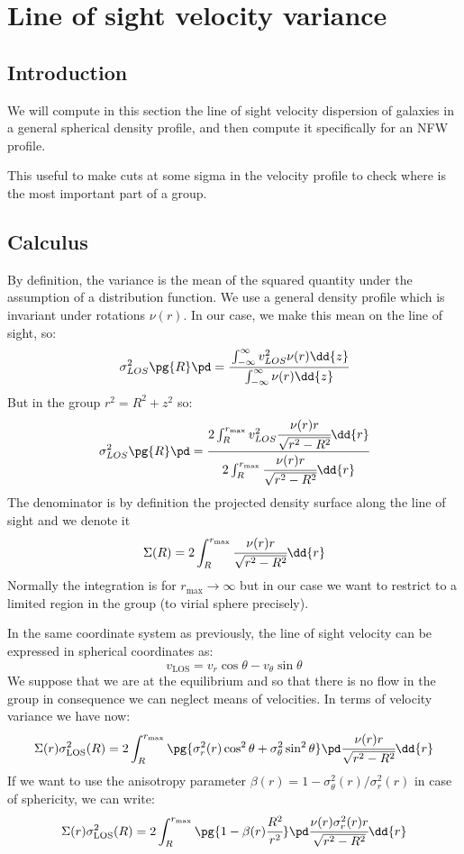 %
\chapter{Line of sight velocity variance}

\newcommand{\mybeta}{%
\beta(r)%
}
\newcommand{\mysigma}{%
\Sigma(r)%
}
\newcommand{\mysiglos}{%
\sigma_{\mathrm{LOS}}^2(R)%
}
\newcommand{\myprofil}{%
\nu(r)%
}

\section{Introduction}

We will compute in this section the line of sight velocity dispersion
of galaxies in a general spherical density profile, and then compute it
specifically for an NFW profile.

This useful to make cuts at some sigma in the velocity profile to check
where is the most important part of a group.

\section{Calculus}

By definition, the variance is the mean of the squared quantity under the
assumption of a distribution function.
We use a general density profile which is invariant under rotations $\nu{(r)}$.
In our case, we make this mean on the line of sight, so:
\[
\sigma_{LOS}^2\pg{R}\pd=\cfrac{\int_{-\infty}^{\infty}{v_{LOS}^2}\nu{(r)}\dd{z}}
{\int_{-\infty}^{\infty}\nu{(r)}\dd{z}}
\]
But in the group $r^2=R^2+z^2$ so:
\[
\sigma_{LOS}^2\pg{R}\pd=\cfrac{2\int_{R}^{r_{\mathrm{max}}}{v_{LOS}^2}\cfrac{\nu{(r)}{r}}{\sqrt{r^2-R^2}}\dd{r}}
{2\int_{R}^{r_{\mathrm{max}}}\cfrac{\nu{(r)}{r}}{\sqrt{r^2-R^2}}\dd{r}}
\]
The denominator is by definition the projected density surface along the line of sight
and we denote it
\[
\Sigma(R) = 2\int_{R}^{r_{\mathrm{max}}}\cfrac{\nu{(r)}{r}}{\sqrt{r^2-R^2}}\dd{r}
\]
Normally the integration is for $r_{\mathrm{max}}\rightarrow\infty$ but in our case
we want to restrict to a limited region in the group (to virial sphere precisely).

In the same coordinate system as previously, the line of sight velocity can be expressed
in spherical coordinates as:
\[
v_{\mathrm{LOS}} = v_r \cos\theta - v_\theta \sin\theta
\]
We suppose that we are at the equilibrium and so that there is
no flow in the group in consequence we can neglect means of velocities.
In terms of velocity variance we have now:
\[
\mysigma\mysiglos = 2\int_R^{r_{\mathrm{max}}}
\pg{\sigma_r^2(r)\cos^2\theta+\sigma_\theta^2\sin^2\theta}\pd
\cfrac{\nu{(r)}{r}}{\sqrt{r^2-R^2}}\dd{r}
\]
If we want to use the anisotropy parameter $\mybeta=1-\sigma_\theta^2(r)/\sigma_r^2(r)$
in case of sphericity, we can write:
\[
\mysigma\mysiglos = 2\int_R^{r_{\mathrm{max}}}
\pg{1-\mybeta\cfrac{R^2}{r^2}}\pd
\cfrac{\nu{(r)}{\sigma_r^2(r)}{r}}{\sqrt{r^2-R^2}}\dd{r}
\]

